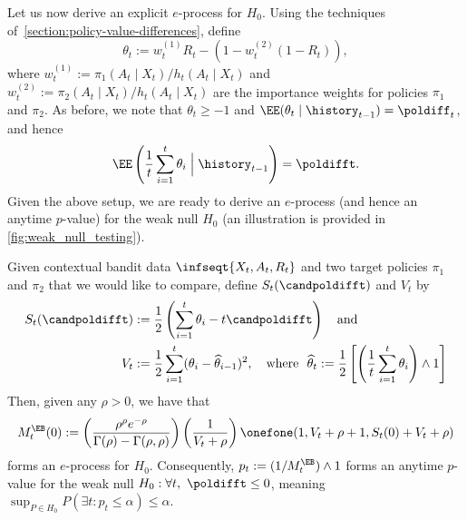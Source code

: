 Let us now derive an explicit $e$-process for $H_0$.
Using the techniques of~\cref{section:policy-value-differences}, define 
\begin{equation}
  \theta_t := w_t^{(1)}R_t - (1-w_t^{(2)}(1-R_t)),
\end{equation}
where $w_t^{(1)} := \pi_1(A_t \mid X_t) / h_t(A_t \mid X_t)$ and $w_t^{(2)} := \pi_2(A_t \mid X_t)/h_t(A_t \mid X_t)$ are the importance weights for policies $\pi_1$ and $\pi_2$. As before, we note that $\theta_t \geq -1$ and $\EE (\theta_t \mid \history_{t-1}) = \poldiff_t$, and hence
\begin{equation}
  \EE \left ( \frac{1}{t}\sum_{i=1}^t \theta_i \Bigm\vert \history_{t-1} \right ) = \poldifft.
\end{equation}
Given the above setup, we are ready to derive an $e$-process (and hence an anytime $p$-value) for the weak null $H_0$ (an illustration is provided in \cref{fig:weak_null_testing}).
\begin{proposition}\label{proposition:testing}
Given contextual bandit data $\infseqt{X_t, A_t, R_t}$ and two target policies $\pi_1$ and $\pi_2$ that we would like to compare, define $S_t(\candpoldifft)$ and $V_t$ by
\begin{align}
  S_t(\candpoldifft) &:= \frac{1}{2}\left ( \sum_{i=1}^t \theta_i - t\candpoldifft \right )~~~\text{and}\\
  V_t &:= \frac{1}{2}\sum_{i=1}^t (\theta_i - \widehat \theta_{i-1})^2, ~~~\text{where}~~\widehat \theta_t := \frac{1}{2} \left [ \left ( \frac{1}{t} \sum_{i=1}^t \theta_i  \right ) \land 1 \right ] 
\end{align}
Then, given any $\rho > 0$, we have that
  \begin{equation}
M_t^\EB(0) := \left(\frac{\rho^\rho e^{-\rho}}{\Gamma(\rho) - \Gamma(\rho, \rho)}\right) \left(\frac{1}{V_t + \rho}\right) \onefone(1, V_t + \rho + 1, S_t(0) + V_t + \rho)
  \end{equation}
  forms an $e$-process for $H_0$. Consequently, $p_t := (1/M_t^\EB) \land 1$ forms an anytime $p$-value for the weak null $H_0: \forall t,\ \poldifft \leq 0$, meaning $\sup_{P \in H_0} P(\exists t : p_t \leq \alpha)\leq \alpha$.
\end{proposition}

